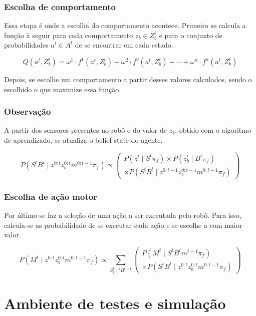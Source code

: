 \subsubsection{Escolha de comportamento}

Essa etapa é onde a escolha do comportamento acontece. Primeiro se calcula a função à seguir para cada comportamento $ z_b \in Z_b^t $ e para o conjunto de probabilidades $ a^t \in A^t $ de se encontrar em cada estado.

\begin{equation}
    	Q \left( a^t, Z_b^t \right) = \omega^1 \cdot f^1 \left( a^t, Z_b^t \right) + \omega^2 \cdot f^2 \left( a^t, Z_b^t \right) + \cdots + \omega^n \cdot f^n \left( a^t, Z_b^t \right)
\end{equation}

Depois, se escolhe um comportamento a partir desses valores calculados, sendo o escolhido o que maximize essa função.

\subsubsection{Observação}

A partir dos sensores presentes no robô e do valor de $ z_b $, obtido com o algoritmo de aprendizado, se atualiza o belief state do agente.

\begin{equation}
    P \left( S^t B^t \mid z^{0: t} z_b^{0: t} m^{0: t-1} \pi_f \right) \propto
        \left(
            \begin{array}{l}
                P \left( z^t \mid S^t \pi_f \right) \times P \left( z_b^t \mid B^t \pi_f \right) \\
                \times P \left( S^t B^t \mid z^{0: t-1} z_b^{0: t-1} m^{0: t-1} \pi_f \right)
            \end{array}
        \right)
\end{equation}


\subsubsection{Escolha de ação motor}

Por último se faz a seleção de uma ação a ser executada pelo robô. Para isso, calcula-se as probabilidade de se executar cada ação e se escolhe a com maior valor.
		
\begin{equation}
    P \left( M^t \mid z^{0: t} z_b^{0: t} m^{0: t-1} \pi_f \right) \propto \sum\limits_{S_i^{t-1} B^{t-1}}
        \left(
            \begin{array}{l}
                P \left( M^t \mid S^t B^t m^{t-1} \pi_f \right)\\
                \times P \left( S^t B^t \mid z^{0: t} z_b^{0: t} m^{0: t-1} \pi_f \right)
            \end{array}
        \right)
\end{equation}


\section{Ambiente de testes e simulação}


